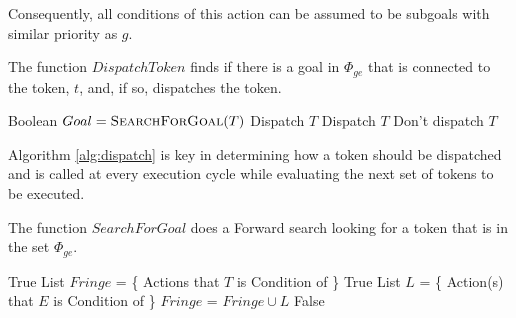 Consequently, all conditions of this action can be assumed to be
subgoals with similar priority as $g$.

\begin{algorithm} [H]
  \caption{\small The function $DispatchToken$ finds if there is a
    goal in $\Phi_{ge}$ that is connected to the token, $t$, and, if
    so, dispatches the token.}
  \label{alg:dispatch}
\label{DispatchToken}
\begin{algorithmic}
\small 
{}
\State Boolean $Goal = \textsc{SearchForGoal}( T )$
	\State \Return Dispatch $T$
	\State \Return Dispatch $T$
\Else
	\State \Return Don't dispatch $T$
\EndIf
\EndFunction
\end{algorithmic}
\end{algorithm}

Algorithm \ref{alg:dispatch} is key in determining how a token should
be dispatched and is called at every execution cycle while evaluating
the next set of tokens to be executed.  %

\begin{algorithm} [H]
  \caption{\small The function $SearchForGoal$ does a Forward search
    looking for a token that is in the set $\Phi_{ge}$.}
  \label{SearchForGoal}
\begin{algorithmic}
  \small
  \State \Return True
  \Else 
  \State List $Fringe$ = \{ Actions that $T$ is Condition of \}
  \State \Return True
  \Else 
  \State List $L$ = \{ Action(s) that $E$ is Condition of \}
  \State $Fringe$ = $Fringe \cup L$ 
  \EndIf
  \EndFor
  \EndFor
  \EndIf
  \State \Return False
\EndFunction
\end{algorithmic}
\end{algorithm}



